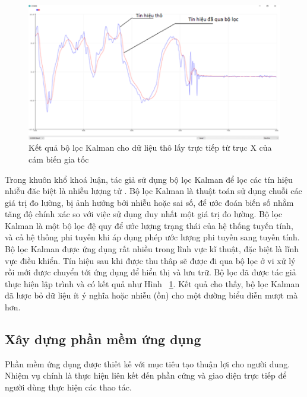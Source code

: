 \begin{figure}[!]
		\centering
 		\includegraphics[width=1\textwidth]{images/kalman.png}
		\caption{Kết quả bộ lọc Kalman cho dữ liệu thô lấy trực tiếp từ trục X của cám biến gia tốc}
		\label{kalman}
\end{figure}
Trong khuôn khổ khoá luận, tác giả sử dụng bộ lọc Kalman để lọc các tín hiệu nhiễu đăc biệt là nhiễu lượng tử \cite{kalman}. Bộ lọc Kalman là thuật toán sử dụng chuỗi các giá trị đo lường, bị ảnh hưởng bởi nhiễu hoặc sai số, để ước đoán biến số nhằm tăng độ chính xác so với việc sử dụng duy nhất một giá trị đo lường. Bộ lọc Kalman là một bộ lọc đệ quy để ước lượng trạng thái của hệ thống tuyến tính, và cả hệ thống phi tuyến khi áp dụng phép ước lượng phi tuyến sang tuyến tính. Bộ lọc Kalman được ứng dụng rất nhiều trong lĩnh vực kĩ thuật, đặc biệt là lĩnh vực điều khiển. Tín hiệu sau khi được thu thâp sẽ được đi qua bộ lọc ở vi xử lý rồi mới được chuyển tới ứng dụng để hiển thị và lưu trữ. Bộ lọc đã được tác giả thực hiện lập trình và có kết quả như Hình ~\ref{kalman}. Kết quả cho thấy, bộ lọc Kalman đã lược bỏ dữ liệu ít ý nghĩa hoặc nhiễu (ồn) cho một đường biểu diễn mượt mà hơn.





\subsection{Xây dựng phần mềm ứng dụng}

Phần mềm ứng dụng được thiết kế với mục tiêu tạo thuận lợi cho người dung. Nhiệm vụ chính là thực hiện liên kết đến phần cứng và giao diện trực tiếp để người dùng thực hiện các thao tác. 


